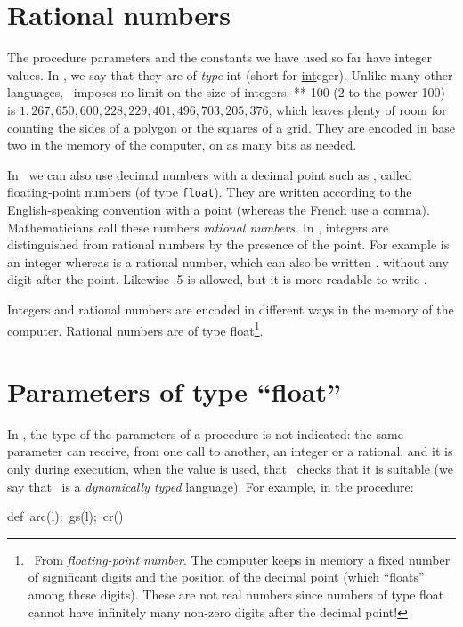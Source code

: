 \section{Rational numbers}
The procedure parameters and the constants we have used so far
have integer values. In \python, we say that they are of {\em type}
{\idt int} (short for \underline{int}eger). Unlike many
other languages, \python\ imposes no limit on the size of integers: { ** 100}
(2 to the power 100) is $1{,}267{,}650{,}600{,}228{,}229{,}401{,}496{,}703{,}205{,}376$, which leaves
plenty of room for counting the sides of a polygon or the squares of a grid. They are encoded
in base two in the memory of the computer, on as many bits as needed.

In \python\ we can also use decimal numbers with a decimal point such as {}, called floating-point numbers (of type \texttt{float}). They
are written according to the English-speaking convention with a point (whereas the French
use a comma). Mathematicians call these numbers {\em rational numbers}. In \python,
integers are distinguished from rational numbers by the presence of the point. For example
{} is an integer whereas {} is a rational number, which can
also be written {.} without any digit after the point. Likewise {\idt .5} is allowed, but
it is more readable to write {}.

Integers and rational numbers are encoded in different ways in the memory
of the computer. Rational numbers are of type {\idt float}\footnote{\ From
{\em floating-point number}. The computer
keeps in memory a fixed number of significant digits and the position of the decimal point
(which ``floats'' among these digits). These are not real
numbers since numbers of type {\idt float} cannot have infinitely many
non-zero digits after the decimal point!}.

\section{Parameters of type ``float''}
In \python, the type of the parameters of a
procedure is not indicated: the same parameter can receive, from one call to another, an integer or a
rational, and it is only during execution, when the value is used,
that \python\ checks that it is suitable (we say that \python\ is a
{\em dynamically typed} language). For example, in the procedure:

\begin{center}
{\mcl def}\ {\idt arc(l):\ gs(l);\ cr()}
\end{center}

